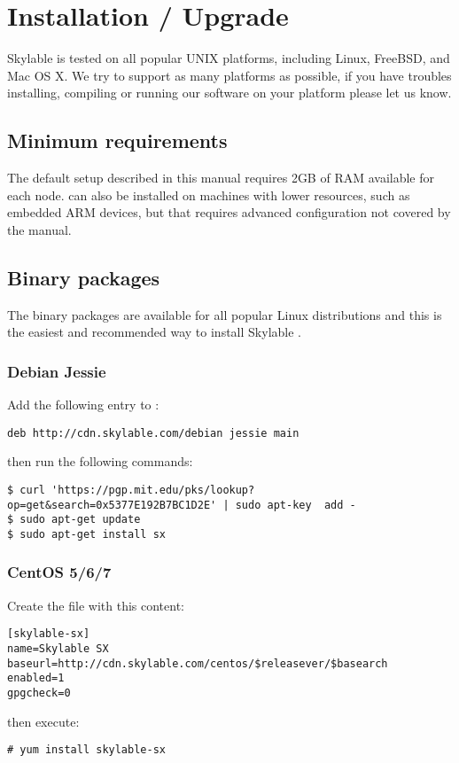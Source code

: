 \chapter{Installation / Upgrade}

Skylable \SX is tested on all popular UNIX platforms, including Linux,
FreeBSD, and Mac OS X. We try to support as many platforms as possible,
if you have troubles installing, compiling or running our software on
your platform please let us know.

\section{Minimum requirements}
The default setup described in this manual requires 2GB of RAM available
for each node. \SX can also be installed on machines with lower resources,
such as embedded ARM devices, but that requires advanced configuration not
covered by the manual.

\section{Binary packages}
The binary packages are available for all popular Linux distributions
and this is the easiest and recommended way to install Skylable \SX.

\subsection{Debian Jessie}
Add the following entry to :
\begin{lstlisting}
deb http://cdn.skylable.com/debian jessie main
\end{lstlisting}
then run the following commands:
\begin{lstlisting}
$ curl 'https://pgp.mit.edu/pks/lookup?op=get&search=0x5377E192B7BC1D2E' | sudo apt-key  add -
$ sudo apt-get update
$ sudo apt-get install sx
\end{lstlisting}

\subsection{CentOS 5/6/7}
Create the file  with this content:
\begin{lstlisting}
[skylable-sx]
name=Skylable SX
baseurl=http://cdn.skylable.com/centos/$releasever/$basearch
enabled=1
gpgcheck=0
\end{lstlisting}
then execute:
\begin{lstlisting}
# yum install skylable-sx
\end{lstlisting}

